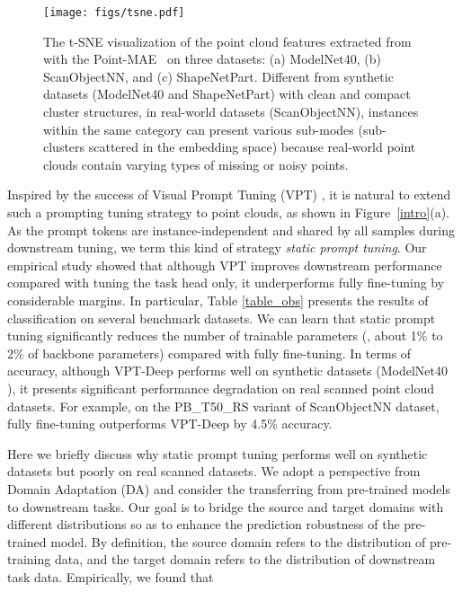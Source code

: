 \documentclass[10pt,twocolumn,letterpaper]{article}
\begin{document}
\begin{figure*}[t]
\centering
\texttt{[image: figs/tsne.pdf]} 
\caption{The t-SNE \cite{van2008visualizing} visualization of the point cloud features extracted from with the Point-MAE~\cite{pang2022masked} on three datasets: (a) ModelNet40, (b) ScanObjectNN, and (c) ShapeNetPart. Different from synthetic datasets (\eg ModelNet40 and ShapeNetPart) with clean and compact cluster structures, in real-world datasets (\eg ScanObjectNN), instances within the same category can present various sub-modes (\ie sub-clusters scattered in the embedding space) because real-world point clouds contain varying types of missing or noisy points. 
}
\label{raw_patch_tsne}
\end{figure*}

Inspired by the success of Visual Prompt Tuning (VPT) \cite{jia2022visual}, it is natural to extend such a prompting tuning strategy to point clouds, as shown in Figure~\ref{intro}(a). As the prompt tokens are instance-independent and shared by all samples during downstream tuning, we term this kind of strategy \emph{static prompt tuning}. Our empirical study showed that although VPT improves downstream performance compared with tuning the task head only, it underperforms fully fine-tuning by considerable margins. In particular, Table \ref{table_obs} presents the results of classification on several benchmark datasets. We can learn that static prompt tuning significantly reduces the number of trainable parameters (\ie, about 1\% to 2\% of backbone parameters) compared with fully fine-tuning. In terms of accuracy, although VPT-Deep performs well on synthetic datasets (\eg ModelNet40 \cite{wu20153d}), it presents significant performance degradation on real scanned point cloud datasets. For example, on the PB\_T50\_RS variant of ScanObjectNN \cite{uy2019revisiting} dataset, fully fine-tuning outperforms VPT-Deep by 4.5\% accuracy. 

Here we briefly discuss why static prompt tuning performs well on synthetic datasets but poorly on real scanned datasets. We adopt a perspective from Domain Adaptation (DA) \cite{aghajanyan2020intrinsic,ben2010theory,ben2006analysis,guo2022domain} and consider the transferring from pre-trained models to downstream tasks. Our goal is to bridge the source and target domains with different distributions so as 
 to enhance the prediction robustness of the pre-trained model. By definition, the source domain  refers to the distribution of pre-training data, and the target domain  refers to the distribution of downstream task data. Empirically, we found that 
\end{document}
